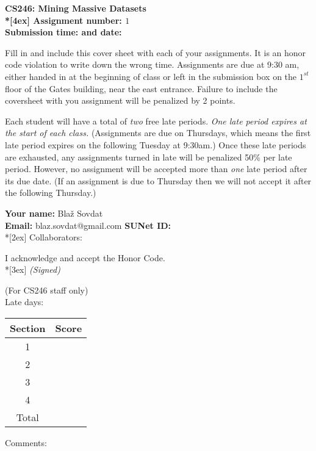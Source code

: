 \begin{titlepage}
	\thispagestyle{empty}
	\parindent 0pt
	\vfill

	\begin{center}
	\LARGE{\bf \textsf{CS246: Mining Massive Datasets} \\*[4ex]
	\Large{
	Assignment number: $1$\hrulefill \\
	Submission time: \hrulefill \quad and date: \hrulefill } }
	\end{center}

	\vfill

	Fill in and include this cover sheet with each of your assignments. It is an honor code violation to write down the wrong time. Assignments are due at 9:30 am, either handed in at the beginning of class or left in the submission box on the $1^{st}$ floor of the Gates building, near the east entrance. Failure to include the coversheet with you assignment will be penalized by 2 points.

	Each student will have a total of {\em two} free late periods. {\em One late period expires at the start of each class.} (Assignments are due on Thursdays, which means the first late period expires on the following Tuesday at 9:30am.) Once these late periods are exhausted, any assignments turned in late will be penalized 50\% per late period. However, no assignment will be accepted more than {\em one} late period after its due date. (If an assignment is due to Thursday then we will not accept it after the following Thursday.) 

	\vfill
	\bigskip
	\vfill

	{\Large
	\textbf{Your name:} Bla\v{z} Sovdat\hrulefill \\
	\textbf{Email:} blaz.sovdat@gmail.com\underline{\hspace*{7cm}} \textbf{SUNet ID:} \hrulefill\\*[2ex] }
	Collaborators:\hrulefill
	\vfill

	I acknowledge and accept the Honor Code.\\*[3ex]
	\bigskip
	\textit{(Signed)}\hrulefill

	\vfill
	\vfill

	\begin{center}
	\normalsize{(For CS246 staff only)\\
	\bigskip
	Late days:  }
	\end{center}


	\begin{center}
	\linespread{1.3}
	\large
	\begin{tabular}{|c|r|}\hline
	Section & \hspace*{1.5cm} Score \\ \hline \hline
	1 &  \\ \hline
	2 &  \\ \hline
	3 &  \\ \hline
	4 &  \\ \hline
	\hline
	Total & \hspace*{1cm} \\ \hline
	\end{tabular}
	\end{center}
	Comments:
\end{titlepage}
